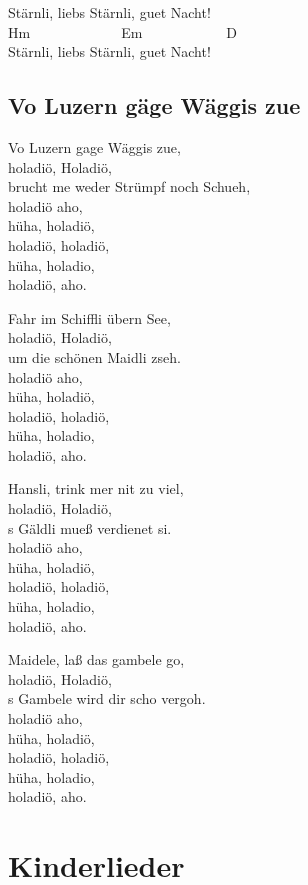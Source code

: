 \documentclass[
  letterpaper,
  twoside=false]{scrbook}
\begin{document}
Stärnli, liebs Stärnli, guet Nacht!\\
Hm~~~~~~~~~~~~~Em~~~~~~~~~~~~D\\
Stärnli, liebs Stärnli, guet Nacht!

\hypertarget{vo-luzern-guxe4ge-wuxe4ggis-zue}{%
\chapter{Vo Luzern gäge Wäggis
zue}\label{vo-luzern-guxe4ge-wuxe4ggis-zue}}

Vo Luzern gage Wäggis zue,\\
holadiö, Holadiö,\\
brucht me weder Strümpf noch Schueh,\\
holadiö aho,\\
hüha, holadiö,\\
holadiö, holadiö,\\
hüha, holadio,\\
holadiö, aho.

Fahr im Schiffli übern See,\\
holadiö, Holadiö,\\
um die schönen Maidli zseh.\\
holadiö aho,\\
hüha, holadiö,\\
holadiö, holadiö,\\
hüha, holadio,\\
holadiö, aho.

Hansli, trink mer nit zu viel,\\
holadiö, Holadiö,\\
\textquotesingle s Gäldli mueß verdienet si.\\
holadiö aho,\\
hüha, holadiö,\\
holadiö, holadiö,\\
hüha, holadio,\\
holadiö, aho.

Maidele, laß das gambele go,\\
holadiö, Holadiö,\\
\textquotesingle s Gambele wird dir scho vergoh.\\
holadiö aho,\\
hüha, holadiö,\\
holadiö, holadiö,\\
hüha, holadio,\\
holadiö, aho.

\part{Kinderlieder}
\end{document}
